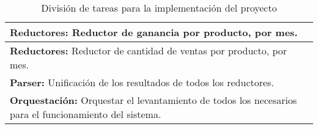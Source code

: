 \begin{table}[H]
\begin{tabularx}{\textwidth}{|X|l|}
\textbf{Reductores:} Reductor de ganancia por producto, por mes. &  \\ \hline
\textbf{Reductores:} Reductor de cantidad de ventas por producto, por mes. &  \\ \hline
\textbf{Parser:} Unificación de los resultados de todos los reductores. &  \\ \hline
\textbf{Orquestación:} Orquestar el levantamiento de todos los necesarios para el funcionamiento del sistema. &  \\ \hline
\end{tabularx}
\caption{División de tareas para la implementación del proyecto}
\end{table}
